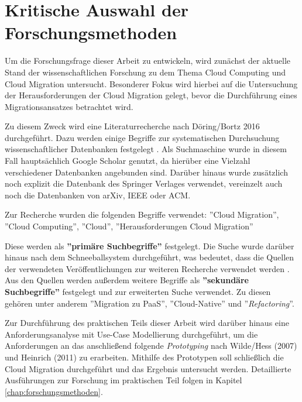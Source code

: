 \section{Kritische Auswahl der Forschungsmethoden}
\label{sec:auswahl_forschungsmethoden}


Um die Forschungsfrage dieser Arbeit zu entwickeln, wird zunächst der aktuelle Stand der wissenschaftlichen Forschung zu dem Thema Cloud Computing und Cloud Migration untersucht. Besonderer Fokus wird hierbei auf die Untersuchung der Herausforderungen der Cloud Migration gelegt, bevor die Durchführung eines Migrationsansatzes betrachtet wird.

Zu diesem Zweck wird eine Literaturrecherche nach Döring/Bortz 2016 durchgeführt. Dazu werden einige Begriffe zur systematischen Durchsuchung wissenschaftlicher Datenbanken festgelegt \cite[Vgl.][S. 158]{Doering2016}. Als Suchmaschine wurde in diesem Fall hauptsächlich Google Scholar genutzt, da hierüber eine Vielzahl verschiedener Datenbanken angebunden sind. Darüber hinaus wurde zusätzlich noch explizit die Datenbank des Springer Verlages verwendet, vereinzelt auch noch die Datenbanken von arXiv, IEEE oder ACM.

Zur Recherche wurden die folgenden Begriffe verwendet: ''Cloud Migration'', ''Cloud Computing'', ''Cloud'', ''Herausforderungen Cloud Migration''

Diese werden als \textbf{''primäre Suchbegriffe''} \cite[S. 158]{Doering2016} festgelegt. Die Suche wurde darüber hinaus nach dem Schneeballsystem durchgeführt, was bedeutet, dass die Quellen der verwendeten Veröffentlichungen zur weiteren Recherche verwendet werden \cite[Vgl.][S. 160]{Doering2016}. Aus den Quellen werden außerdem weitere Begriffe als \textbf{''sekundäre Suchbegriffe''} \cite[S. 158]{Doering2016} festgelegt und zur erweiterten Suche verwendet. Zu diesen gehören unter anderem ''Migration zu PaaS'', ''Cloud-Native'' und ''\textit{Refactoring}''.

Zur Durchführung des praktischen Teils dieser Arbeit wird darüber hinaus eine Anforderungsanalyse mit Use-Case Modellierung durchgeführt, um die Anforderungen an das anschließend folgende \textit{Prototyping} nach Wilde/Hess (2007) und Heinrich (2011) zu erarbeiten. Mithilfe des Prototypen soll schließlich die Cloud Migration durchgeführt und das Ergebnis untersucht werden. Detaillierte Ausführungen zur Forschung im praktischen Teil folgen in Kapitel \ref{chap:forschungsmethoden}.